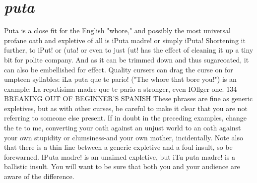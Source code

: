 \section{\emph{puta}}

Puta is a close fit for the English "whore," and possibly the
most universal profane oath and expletive of all is iPuta madre! or
simply iPuta! Shortening it further, to iPut! or (uta! or even to just
(ut! has the effect of cleaning it up a tiny bit for polite company. And
as it can be trimmed down and thus sugarcoated, it can also be embellished for effect. Quality cursers can drag the curse on for umpteen syllables: iLa puta que te pario! ("The whore that bore you!") is an example; La reputisima madre que te pario a stronger, even IOllger one.
134 BREAKING OUT OF BEGINNER'S SPANISH
These phrases are fine as generic expletives, but as with other
curses, be careful to make it clear that you are not referring to someone else present. If in doubt in the preceding examples, change the te
to me, converting your oath against an unjust world to an oath against
your own stupidity or clumsiness-and your own mother, incidentally.
Note also that there is a thin line between a generic expletive and a
foul insult, so be forewarned. IPuta madre! is an unaimed expletive,
but iTu puta madre! is a ballistic insult. You will want to be sure that
both you and your audience are aware of the difference.

